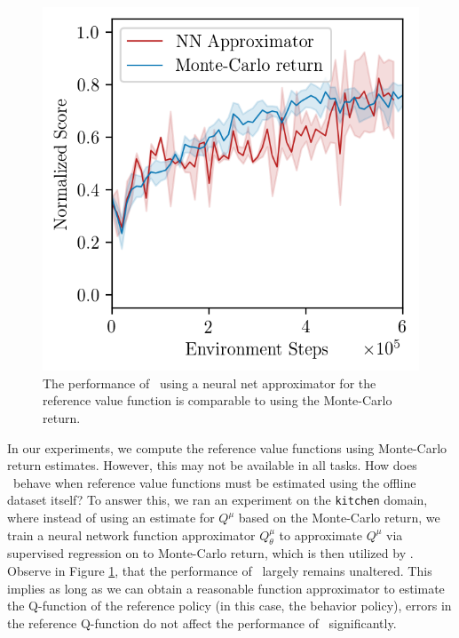 \begin{figure}
\vspace{-0.9cm}
\begin{center}
\includegraphics[width=0.9\linewidth]{figs-sample/kitchen-analysis.png}
\vspace{-0.2cm}
\caption{\footnotesize{The performance of \methodname\ using a neural net approximator for the reference value function is comparable to using the Monte-Carlo return.}}
\label{fig:kitchen-regress}
\vspace{-0.8cm}
\end{center}
\end{figure}

In our experiments, we compute the reference value functions using Monte-Carlo return estimates. However, this may not be available in all tasks. How does \methodname\ behave when reference value functions must be estimated using the offline dataset itself? To answer this, we ran an experiment on the \texttt{kitchen} domain, where instead of using an estimate for $Q^\mu$ based on the Monte-Carlo return, we train a neural network function approximator $Q^\mu_\theta$ to approximate $Q^\mu$ via supervised regression on to Monte-Carlo return, which is then utilized by \methodname. 
Observe in Figure \ref{fig:kitchen-regress}, that the performance of \methodname\ largely remains unaltered. This implies as long as we can obtain a reasonable function approximator to estimate the Q-function of the reference policy (in this case, the behavior policy), errors in the reference Q-function do not affect the performance of \methodname\ significantly.

